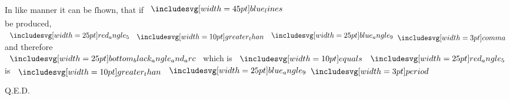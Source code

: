 \documentclass[11pt,preview]{standalone}
\begin{document}
\begin{center}
    In like manner it can be ſhown, that if $\bimg{blue_lines}$\\
    be produced, $\img{red_angle_5} \bgt \img{blue_angle_9} \bcomma$ and therefore\\
    $\img{bottom_black_angle_and_arc}$ which is $\bequals \img{red_angle_5}$ is $\bgt \img{blue_angle_9} \bperiod$
\end{center}

\hfill

\hfill Q.E.D.
\end{document}
